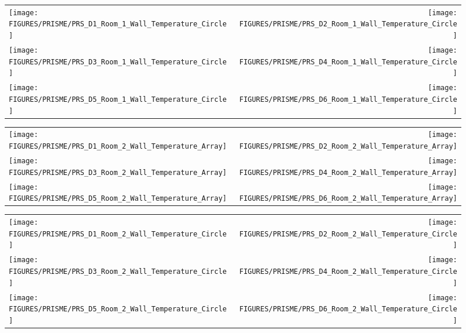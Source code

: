\begin{figure}[p]
\begin{tabular*}{\textwidth}{l@{\extracolsep{\fill}}r}
\texttt{[image: FIGURES/PRISME/PRS\_D1\_Room\_1\_Wall\_Temperature\_Circle]} &
\texttt{[image: FIGURES/PRISME/PRS\_D2\_Room\_1\_Wall\_Temperature\_Circle]} \\
\texttt{[image: FIGURES/PRISME/PRS\_D3\_Room\_1\_Wall\_Temperature\_Circle]} &
\texttt{[image: FIGURES/PRISME/PRS\_D4\_Room\_1\_Wall\_Temperature\_Circle]} \\
\texttt{[image: FIGURES/PRISME/PRS\_D5\_Room\_1\_Wall\_Temperature\_Circle]} &
\texttt{[image: FIGURES/PRISME/PRS\_D6\_Room\_1\_Wall\_Temperature\_Circle]}
\end{tabular*}
\label{PRISME_Wall_Circle_Room_1}
\end{figure}

\begin{figure}[p]
\begin{tabular*}{\textwidth}{l@{\extracolsep{\fill}}r}
\texttt{[image: FIGURES/PRISME/PRS\_D1\_Room\_2\_Wall\_Temperature\_Array]} &
\texttt{[image: FIGURES/PRISME/PRS\_D2\_Room\_2\_Wall\_Temperature\_Array]} \\
\texttt{[image: FIGURES/PRISME/PRS\_D3\_Room\_2\_Wall\_Temperature\_Array]} &
\texttt{[image: FIGURES/PRISME/PRS\_D4\_Room\_2\_Wall\_Temperature\_Array]} \\
\texttt{[image: FIGURES/PRISME/PRS\_D5\_Room\_2\_Wall\_Temperature\_Array]} &
\texttt{[image: FIGURES/PRISME/PRS\_D6\_Room\_2\_Wall\_Temperature\_Array]}
\end{tabular*}
\label{PRISME_Wall_Array_Room_2}
\end{figure}

\begin{figure}[p]
\begin{tabular*}{\textwidth}{l@{\extracolsep{\fill}}r}
\texttt{[image: FIGURES/PRISME/PRS\_D1\_Room\_2\_Wall\_Temperature\_Circle]} &
\texttt{[image: FIGURES/PRISME/PRS\_D2\_Room\_2\_Wall\_Temperature\_Circle]} \\
\texttt{[image: FIGURES/PRISME/PRS\_D3\_Room\_2\_Wall\_Temperature\_Circle]} &
\texttt{[image: FIGURES/PRISME/PRS\_D4\_Room\_2\_Wall\_Temperature\_Circle]} \\
\texttt{[image: FIGURES/PRISME/PRS\_D5\_Room\_2\_Wall\_Temperature\_Circle]} &
\texttt{[image: FIGURES/PRISME/PRS\_D6\_Room\_2\_Wall\_Temperature\_Circle]}
\end{tabular*}
\label{PRISME_Wall_Circle_Room_2}
\end{figure}

